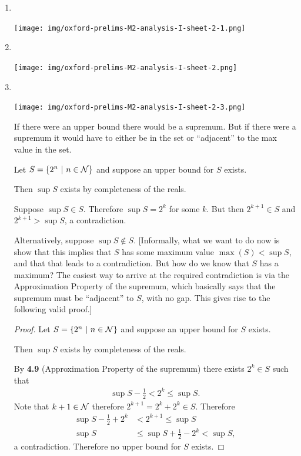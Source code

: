 \begin{enumerate}
\item~\\
  \begin{mdframed}
    \texttt{[image: img/oxford-prelims-M2-analysis-I-sheet-2-1.png]}
  \end{mdframed}
\item~\\
  \begin{mdframed}
    \texttt{[image: img/oxford-prelims-M2-analysis-I-sheet-2.png]}
  \end{mdframed}
\item~\\
  \begin{mdframed}
    \texttt{[image: img/oxford-prelims-M2-analysis-I-sheet-2-3.png]}
  \end{mdframed}

  \begin{intuition*}
    If there were an upper bound there would be a supremum. But if there were a supremum it would
    have to either be in the set or ``adjacent'' to the max value in the set.
  \end{intuition*}

  \begin{intuition*}
    Let $S = \{2^n ~|~ n \in \mathcal{N}\}$ and suppose an upper bound for $S$ exists.

    Then $\sup S$ exists by completeness of the reals.

    Suppose $\sup S \in S$. Therefore $\sup S = 2^k$ for some $k$. But then $2^{k+1} \in S$ and
    $2^{k+1} > \sup S$, a contradiction.

    Alternatively, suppose $\sup S \not\in S$. [Informally, what we want to do now is show that
    this implies that $S$ has some maximum value $\max(S) < \sup S$, and that that leads to a
    contradiction. But how do we know that $S$ has a maximum? The easiest way to arrive at the
    required contradiction is via the Approximation Property of the supremum, which basically says
    that the supremum must be ``adjacent'' to $S$, with no gap. This gives rise to the following
    valid proof.]
  \end{intuition*}

  \begin{proof}
    Let $S = \{2^n ~|~ n \in \mathcal{N}\}$ and suppose an upper bound for $S$ exists.

    Then $\sup S$ exists by completeness of the reals.

    By {\bf 4.9} (Approximation Property of the supremum) there exists $2^k \in S$ such that
    \begin{align*}
      \sup S - \frac{1}{2} < 2^k \leq \sup S.
    \end{align*}
    Note that $k+1 \in \mathcal{N}$ therefore $2^{k+1} = 2^k + 2^k \in S$. Therefore
    \begin{align*}
      \sup S - \frac{1}{2} + 2^k &< 2^{k+1} \leq \sup S\\
      \sup S &\leq \sup S + \frac{1}{2} - 2^k < \sup S,
    \end{align*}
    a contradiction. Therefore no upper bound for $S$ exists.
  \end{proof}


\end{enumerate}
